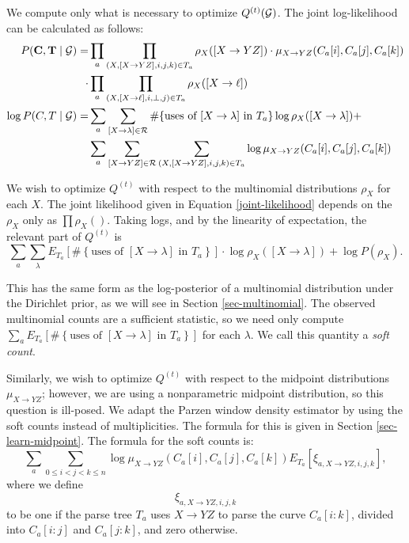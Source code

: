 We compute only what is necessary to optimize $Q^{(t)}({\mathcal G})$. The
joint log-likelihood can be calculated as follows:
\begin{align*}
  P(\mathbf{C},\mathbf{T}\mid {\mathcal G}) = &\prod_a \prod_{(X,[X\to YZ],i,j,k)\in T_a} \rho_X([X\to YZ]) \cdot \mu_{X\to YZ}(C_a[i], C_a[j], C_a[k]) \\
  \cdot &\prod_a \prod_{(X,[X\to \ell],i,\bot,j)\in T_a} \rho_X([X\to \ell]) \\
  \log P(C,T\mid {\mathcal G}) = &\sum_a \sum_{[X\to \lambda] \in {\mathcal R}}
  \#\{\mbox{uses of }[X\to \lambda]\mbox{ in } T_a \} \log \rho_X([X\to \lambda]) +\\
  &\sum_a \sum_{[X\to YZ] \in {\mathcal R}} \sum_{(X, [X\to YZ], i, j,k)\in T_a} \log
  \mu_{X\to YZ}(C_a[i], C_a[j], C_a[k])\\
\end{align*}

We wish to optimize $Q^{(t)}$ with respect to the multinomial
distributions $\rho_X$ for each $X$. The joint likelihood given in
Equation \ref{joint-likelihood} depends on the $\rho_X$ only as $\prod
\rho_X()$. Taking logs, and by the linearity of expectation, the
relevant part of $Q^{(t)}$ is
$$\sum_a \sum_\lambda E_{T_a}\left[ \#\left\{\mbox{uses of }[X\to
    \lambda] \mbox{ in }T_a \right\}\right]\cdot \log \rho_{X}([X\to \lambda]) +
\log P(\rho_X).$$

This has the same form as the log-posterior of a multinomial
distribution under the Dirichlet prior, as we will see in Section
\ref{sec-multinomial}. The observed multinomial counts are a
sufficient statistic, so we need only compute $\sum_a E_{T_a}\left[
  \#\left\{\mbox{uses of }[X\to \lambda] \mbox{ in } T_a
  \right\}\right]$ for each $\lambda$. We call this quantity a
\emph{soft count}.

Similarly, we wish to optimize $Q^{(t)}$ with respect to the midpoint
distributions $\mu_{X\to YZ}$; however, we are using a nonparametric
midpoint distribution, so this question is ill-posed. We adapt the
Parzen window density estimator by using the soft counts instead of
multiplicities. The formula for this is given in Section
\ref{sec-learn-midpoint}.  The formula for the soft counts is:
$$\sum_a \sum_{0\le i < j < k\le n} \log \mu_{X\to YZ}(C_a[i], C_a[j], C_a[k])
 E_{T_a}\left[ \xi_{a, X\to YZ, i,j,k} \right],$$
where we define
$$\xi_{a, X\to YZ,i,j,k}$$
to be one if the parse tree $T_a$ uses $X\to YZ$ to parse the curve
$C_a[i:k]$, divided into $C_a[i:j]$ and $C_a[j:k]$, and zero otherwise.

